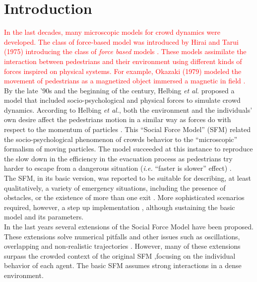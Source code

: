 \documentclass[preprint,12pt]{elsarticle}
\begin{document}

\section{\label{introduction}Introduction}

\textcolor{red}{In the last decades, many microscopic models 
for crowd dynamics were developed. The class of force-based model was introduced by Hirai 
and Tarui (1975) introducing the class of \textit{force based} models 
\cite{Hirai}. These models assimilate the interaction between 
pedestrians and their environment using different kinds of forces inspired on physical systems. For 
example, Okazaki (1979) modeled the movement of pedestrians as 
a magnetized object immersed a magnetic in field \cite{Okazaki}.}\\

By the late '90s and the beginning of the century, Helbing 
\textit{et al.} proposed a model that included socio-psychological and physical 
forces to simulate crowd dynamics. According to Helbing \textit{et al.}, both 
the environment and the individuals' own desire affect the pedestrians motion in 
a similar way as forces do with respect to the momentum of particles 
\cite{Helbing1,Helbing4}. This ``Social Force Model'' (SFM) related the 
socio-psychological phenomenon of crowds behavior to the ``microscopic'' 
formalism of moving particles. The model succeeded at this instance to 
reproduce the slow down in the efficiency in the evacuation process as 
pedestrians try harder to escape from a dangerous situation (\textit{i.e.} 
``faster is slower'' effect) \cite{Helbing1,Dorso1,Dorso2}. \\ 

The SFM, in its basic version, was reported to be suitable for describing, 
at least qualitatively, a variety of emergency situations, including the presence
of obstacles, or the existence of more than one exit \cite{Dorso3,Dorso5}.
More sophisticated scenarios required, however, a step up implementation
\cite{Cornes1,Dorso4,Dorso6}, although sustaining the basic model and its parameters.  \\

In the last years several extensions of the Social Force Model have been 
proposed. These extensions solve numerical pitfalls \cite{koster1} 
and other issues such as oscillations, overlapping and non-realistic trajectories
\cite{chraibi1,dietrich1}. However, many of these extensions surpass the 
crowded context of the original SFM \cite{Helbing1,Helbing4},focusing on the 
individual behavior of each agent. The basic SFM assumes strong interactions
in a dense environment.\\
\end{document}
